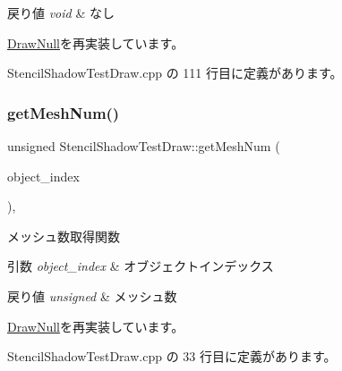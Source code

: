 \begin{DoxyRetVals}{戻り値}
{\em void} & なし \\
\hline
\end{DoxyRetVals}


\mbox{\hyperlink{class_draw_null_a72ac0b7dc40b1469582419dcc5b0e114}{Draw\+Null}}を再実装しています。



 Stencil\+Shadow\+Test\+Draw.\+cpp の 111 行目に定義があります。

\mbox{\label{class_stencil_shadow_test_draw_a285b3045ff5cc34b6b2b991cca434bb3}} 
\subsubsection{\texorpdfstring{get\+Mesh\+Num()}{getMeshNum()}}
{\footnotesize\ttfamily unsigned Stencil\+Shadow\+Test\+Draw\+::get\+Mesh\+Num (\begin{DoxyParamCaption}\item[{unsigned}]{object\+\_\+index }\end{DoxyParamCaption})\hspace{0.3cm}{\ttfamily [override]}, {\ttfamily [virtual]}}



メッシュ数取得関数 


\begin{DoxyParams}{引数}
{\em object\+\_\+index} & オブジェクトインデックス \\
\hline
\end{DoxyParams}

\begin{DoxyRetVals}{戻り値}
{\em unsigned} & メッシュ数 \\
\hline
\end{DoxyRetVals}


\mbox{\hyperlink{class_draw_null_a4c566a37d27fac3dcf76c7970443f375}{Draw\+Null}}を再実装しています。



 Stencil\+Shadow\+Test\+Draw.\+cpp の 33 行目に定義があります。

\mbox{\label{class_stencil_shadow_test_draw_ad93f1c8a60a701d185108896c58dd578}} 
